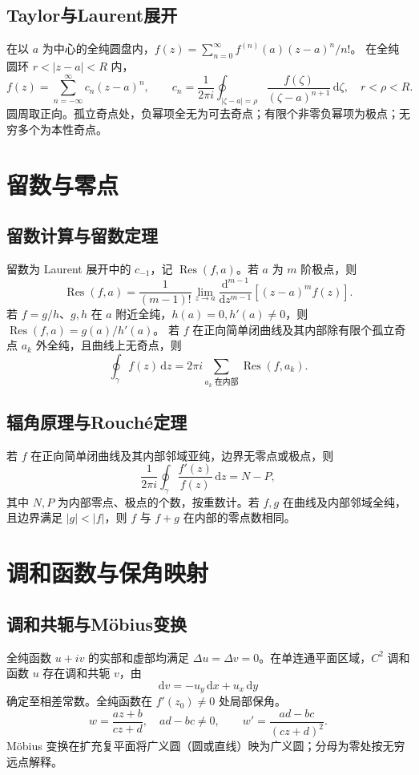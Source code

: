 \documentclass[../main.tex]{subfiles}
\begin{document}
\subsection{Taylor与Laurent展开}
在以 $a$ 为中心的全纯圆盘内，$f(z)=\sum_{n=0}^\infty f^{(n)}(a)(z-a)^n/n!$。
在全纯圆环 $r<|z-a|<R$ 内，
\[
f(z)=\sum_{n=-\infty}^{\infty}c_n(z-a)^n,\qquad
c_n=\frac1{2\pi i}\oint_{|\zeta-a|=\rho}\frac{f(\zeta)}{(\zeta-a)^{n+1}}\,\mathrm d\zeta,
\quad r<\rho<R.
\]
圆周取正向。孤立奇点处，负幂项全无为可去奇点；有限个非零负幂项为极点；无穷多个为本性奇点。
\section{留数与零点}
\subsection{留数计算与留数定理}
留数为 Laurent 展开中的 $c_{-1}$，记 $\operatorname{Res}(f,a)$。若 $a$ 为 $m$ 阶极点，则
\[
\operatorname{Res}(f,a)=\frac1{(m-1)!}\lim_{z\to a}
\frac{\mathrm d^{m-1}}{\mathrm dz^{m-1}}[(z-a)^mf(z)].
\]
若 $f=g/h$、$g,h$ 在 $a$ 附近全纯，$h(a)=0,h'(a)\ne0$，则 $\operatorname{Res}(f,a)=g(a)/h'(a)$。
若 $f$ 在正向简单闭曲线及其内部除有限个孤立奇点 $a_k$ 外全纯，且曲线上无奇点，则
\[
\oint_\gamma f(z)\,\mathrm dz=2\pi i\sum_{a_k\text{ 在内部}}\operatorname{Res}(f,a_k).
\]
\subsection{辐角原理与Rouché定理}
若 $f$ 在正向简单闭曲线及其内部邻域亚纯，边界无零点或极点，则
\[
\frac1{2\pi i}\oint_\gamma\frac{f'(z)}{f(z)}\,\mathrm dz=N-P,
\]
其中 $N,P$ 为内部零点、极点的个数，按重数计。若 $f,g$ 在曲线及内部邻域全纯，且边界满足 $|g|<|f|$，则 $f$ 与 $f+g$ 在内部的零点数相同。
\section{调和函数与保角映射}
\subsection{调和共轭与Möbius变换}
全纯函数 $u+iv$ 的实部和虚部均满足 $\Delta u=\Delta v=0$。在单连通平面区域，$C^2$ 调和函数 $u$ 存在调和共轭 $v$，由
\[
\mathrm dv=-u_y\,\mathrm dx+u_x\,\mathrm dy
\]
确定至相差常数。全纯函数在 $f'(z_0)\ne0$ 处局部保角。
\[
w=\frac{az+b}{cz+d},\quad ad-bc\ne0,\qquad
w'=\frac{ad-bc}{(cz+d)^2}.
\]
Möbius 变换在扩充复平面将广义圆（圆或直线）映为广义圆；分母为零处按无穷远点解释。
\end{document}

